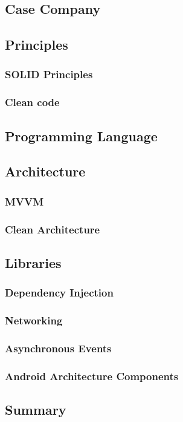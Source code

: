 \subsection{Case Company}

\subsection{Principles}
\subsubsection{SOLID Principles}
\label{section:4.2.1}
\subsubsection{Clean code}
\label{section:4.2.2}

\subsection{Programming Language}
\label{section:4.3}

\subsection{Architecture}
\subsubsection{MVVM}
\label{section:4.4.1}
\subsubsection{Clean Architecture}
\label{section:4.4.2}

\subsection{Libraries}


\subsubsection{Dependency Injection}
\label{section:4.5.1}
\subsubsection{Networking}
\label{section:4.5.2}
\subsubsection{Asynchronous Events}
\label{section:4.5.3}
\subsubsection{Android Architecture Components}
\label{section:4.5.4}

\subsection{Summary}